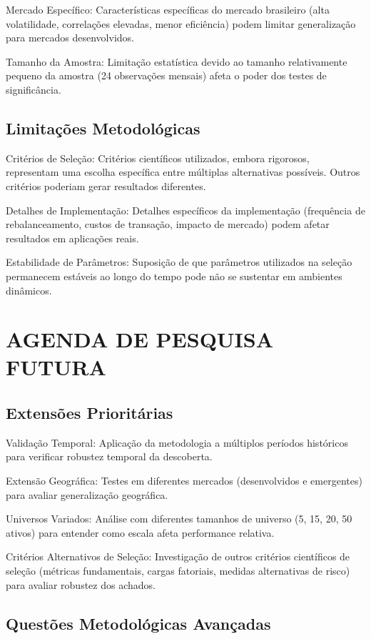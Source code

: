 Mercado Específico: Características específicas do mercado brasileiro (alta volatilidade, correlações elevadas, menor eficiência) podem limitar generalização para mercados desenvolvidos.

Tamanho da Amostra: Limitação estatística devido ao tamanho relativamente pequeno da amostra (24 observações mensais) afeta o poder dos testes de significância.

\subsection{Limitações Metodológicas}

Critérios de Seleção: Critérios científicos utilizados, embora rigorosos, representam uma escolha específica entre múltiplas alternativas possíveis. Outros critérios poderiam gerar resultados diferentes.

Detalhes de Implementação: Detalhes específicos da implementação (frequência de rebalanceamento, custos de transação, impacto de mercado) podem afetar resultados em aplicações reais.

Estabilidade de Parâmetros: Suposição de que parâmetros utilizados na seleção permanecem estáveis ao longo do tempo pode não se sustentar em ambientes dinâmicos.

\section{AGENDA DE PESQUISA FUTURA}

\subsection{Extensões Prioritárias}

Validação Temporal: Aplicação da metodologia a múltiplos períodos históricos para verificar robustez temporal da descoberta.

Extensão Geográfica: Testes em diferentes mercados (desenvolvidos e emergentes) para avaliar generalização geográfica.

Universos Variados: Análise com diferentes tamanhos de universo (5, 15, 20, 50 ativos) para entender como escala afeta performance relativa.

Critérios Alternativos de Seleção: Investigação de outros critérios científicos de seleção (métricas fundamentais, cargas fatoriais, medidas alternativas de risco) para avaliar robustez dos achados.

\subsection{Questões Metodológicas Avançadas}

